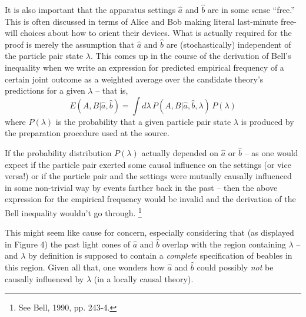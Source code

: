 \documentclass[12pt]{article}
\begin{document}
It is also important that the apparatus settings $\hat{a}$ and
$\hat{b}$ are in some sense ``free.''  This is often discussed in
terms of Alice and Bob making literal last-minute free-will choices
about how to orient their devices.  What is actually required for the
proof is merely the assumption that $\hat{a}$ and $\hat{b}$ are
(stochastically)
independent of the particle pair state $\lambda$.
This comes up in the course of the derivation of Bell's inequality
when we write an expression for predicted empirical frequency of a certain
joint outcome as a weighted average over the candidate theory's
predictions for a given $\lambda$ -- that is,
\begin{equation}
E(A,B|\hat{a},\hat{b}) = \int d\lambda \, P(A,B|\hat{a},\hat{b},\lambda)
\, P(\lambda)
\end{equation}
where $P(\lambda)$ is the probability that a given particle pair state
$\lambda$ is produced by the preparation procedure used at the source.

If the probability distribution $P(\lambda)$ actually depended on
$\hat{a}$ or $\hat{b}$ -- as one would expect if the 
particle pair exerted some causal influence on the settings (or vice
versa!) or if the particle pair and the settings were mutually causally
influenced in some non-trivial way by events farther back in the past
-- then the above expression for the empirical frequency would be
invalid and the derivation of the Bell inequality wouldn't go through.%
\footnote{See Bell, 1990, pp. 243-4.}

This might seem like cause for concern, especially considering that
(as displayed in Figure 4) the past light cones of $\hat{a}$ and
$\hat{b}$ overlap with the region containing
$\lambda$ -- and $\lambda$ by definition is supposed
to contain a \emph{complete} specification of beables in this region.
Given all that, one wonders how $\hat{a}$ and $\hat{b}$ could possibly
\emph{not} be causally influenced by $\lambda$ (in a locally causal
theory).  
\end{document}
